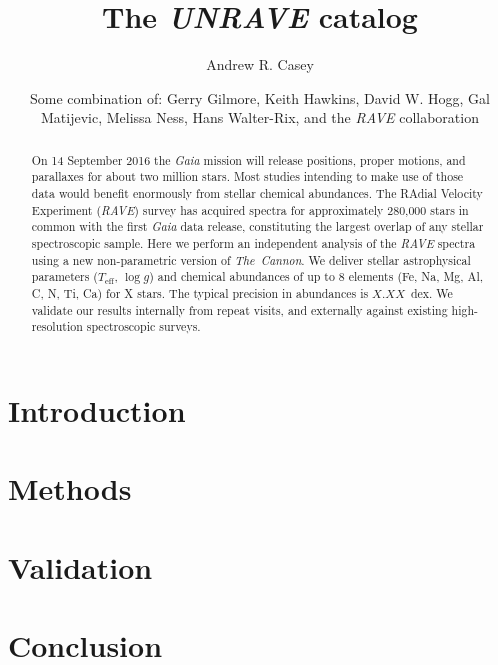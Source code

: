 \documentclass[preprint2,trackchanges]{aastex}
\newcommand{\project}[1]{\textsl{#1}}
\newcommand{\thecannon}{\project{The~Cannon}}
\newcommand{\logg}{\log g}
\newcommand{\teff}{T_{\mathrm{eff}}}
\begin{document}
\title{The \project{UNRAVE} catalog}

\author{Andrew R. Casey}

\author{Some combination of: Gerry Gilmore, Keith Hawkins, David W. Hogg, Gal Matijevic, Melissa Ness, Hans Walter-Rix, and the \project{RAVE} collaboration}

\begin{abstract}
On 14 September 2016 the \project{Gaia} mission will release positions, proper motions, and parallaxes for about two million stars.  Most studies intending to make use of those data would benefit enormously from stellar chemical abundances.
  The RAdial Velocity Experiment (\project{RAVE}) survey has acquired spectra for approximately 280,000 stars in common with the first \project{Gaia} data release, constituting the largest overlap of any stellar spectroscopic sample.  Here we perform an independent analysis of the \project{RAVE} spectra using a new non-parametric version of \thecannon.  We deliver stellar astrophysical parameters ($\teff$, $\logg$) and chemical abundances of up to 8 elements (Fe, Na, Mg, Al, C, N, Ti, Ca) for X stars.  The typical precision in abundances is $X.XX$~dex.  We validate our results internally from repeat visits, and externally against existing high-resolution spectroscopic surveys. 
\end{abstract}

\keywords{}

\section{Introduction} 
\label{sec:introduction}


\section{Methods}
\label{sec:methods}


\section{Validation}
\label{sec:validation}


\section{Conclusion}
\label{sec:conclusion}


\acknowledgements
\end{document}
